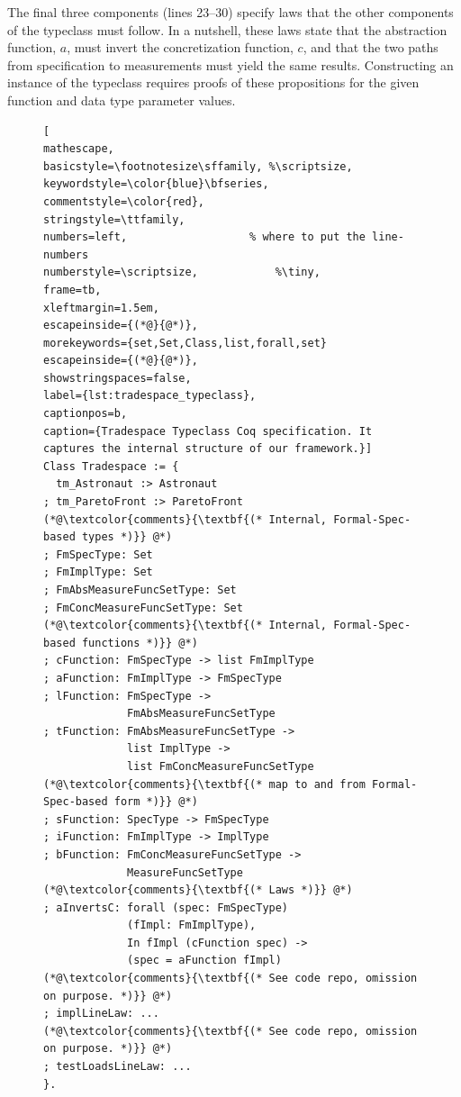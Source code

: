 \documentclass{sig-alternate}
\begin{document}
The final three components (lines 23--30) specify laws that the other components of the typeclass must follow. In a nutshell, these laws state that the abstraction function, $a$, must invert the concretization function, $c$, and that the two paths from specification to measurements must yield the same results. Constructing an instance of the typeclass requires proofs of these propositions for the given function and data type parameter values.

\begin{figure}
\vspace{0.5cm}
\begin{lstlisting}[
mathescape,
basicstyle=\footnotesize\sffamily, %\scriptsize,
keywordstyle=\color{blue}\bfseries,
commentstyle=\color{red},
stringstyle=\ttfamily,
numbers=left,					% where to put the line-numbers
numberstyle=\scriptsize,			%\tiny,      
frame=tb,
xleftmargin=1.5em,
escapeinside={(*@}{@*)},	
morekeywords={set,Set,Class,list,forall,set}
escapeinside={(*@}{@*)},
showstringspaces=false,
label={lst:tradespace_typeclass},
captionpos=b,
caption={Tradespace Typeclass Coq specification. It captures the internal structure of our framework.}]
Class Tradespace := {
  tm_Astronaut :> Astronaut
; tm_ParetoFront :> ParetoFront
(*@\textcolor{comments}{\textbf{(* Internal, Formal-Spec-based types *)}} @*)
; FmSpecType: Set
; FmImplType: Set
; FmAbsMeasureFuncSetType: Set
; FmConcMeasureFuncSetType: Set
(*@\textcolor{comments}{\textbf{(* Internal, Formal-Spec-based functions *)}} @*)
; cFunction: FmSpecType -> list FmImplType
; aFunction: FmImplType -> FmSpecType
; lFunction: FmSpecType ->
             FmAbsMeasureFuncSetType
; tFunction: FmAbsMeasureFuncSetType ->
             list ImplType ->
             list FmConcMeasureFuncSetType
(*@\textcolor{comments}{\textbf{(* map to and from Formal-Spec-based form *)}} @*)             
; sFunction: SpecType -> FmSpecType
; iFunction: FmImplType -> ImplType
; bFunction: FmConcMeasureFuncSetType ->
             MeasureFuncSetType
(*@\textcolor{comments}{\textbf{(* Laws *)}} @*)             
; aInvertsC: forall (spec: FmSpecType)
             (fImpl: FmImplType),
             In fImpl (cFunction spec) ->
             (spec = aFunction fImpl)
(*@\textcolor{comments}{\textbf{(* See code repo, omission on purpose. *)}} @*)                          
; implLineLaw: ...
(*@\textcolor{comments}{\textbf{(* See code repo, omission on purpose. *)}} @*)                          
; testLoadsLineLaw: ...
}.
\end{lstlisting}
\end{figure}
\end{document}
